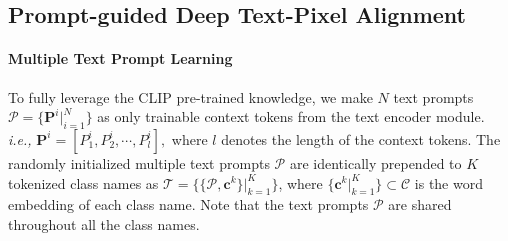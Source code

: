 \documentclass[nohyperref]{article}
\newcommand{\bs}{\boldsymbol}
\newcommand{\mc}{\mathcal}
\newcommand{\mbf}{\mathbf}
\theoremstyle{plain}
\theoremstyle{definition}
\theoremstyle{remark}
\begin{document}
\subsection{Prompt-guided Deep Text-Pixel Alignment}

 \paragraph{Multiple Text Prompt Learning}

 To fully leverage the CLIP pre-trained knowledge, we make $N$ text prompts $\mathcal{P} = \{\bs{P}^{i}|^N_{i=1}\}$ as only trainable context tokens from the text encoder module. \textit{i.e.,} $\bs{P}^i =[P^i_1,P^i_2, \cdots, P^i_l],$ where $l$ denotes the length of the context tokens. 
 The randomly initialized multiple text prompts $\mathcal{P}$ are identically prepended to $K$ tokenized class names as $\mathcal{T} = \{\{\mathcal{P}, \bs{c}^k\}|^K_{k=1}\}$, where $\{\bs{c}^k|_{k=1}^K\} \subset \mc{C}$ is the word embedding of each class name. Note that the text prompts $\mathcal{P}$ are shared throughout all the class names. 
\end{document}

